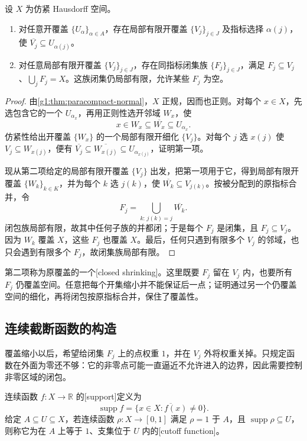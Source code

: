 \begin{lemma}\label{g1:lem:cover-shrinking}
	设 \(X\) 为仿紧 Hausdorff 空间。
	\begin{enumerate}
		\item 对任意开覆盖 \(\{U_\alpha\}_{\alpha\in A}\)，存在局部有限开覆盖 \(\{V_j\}_{j\in J}\) 及指标选择 \(\alpha(j)\)，使 \(\overline{V_j}\subseteq U_{\alpha(j)}\)。
		\item 对任意局部有限开覆盖 \(\{V_j\}_{j\in J}\)，存在同指标闭集族 \(\{F_j\}_{j\in J}\)，满足 \(F_j\subseteq V_j\)、\(\bigcup_jF_j=X\)。这族闭集仍局部有限，允许某些 \(F_j\) 为空。
	\end{enumerate}
\end{lemma}
\begin{proof}
	由\cref{g1:thm:paracompact-normal}，\(X\) 正规，因而也正则。对每个 \(x\in X\)，先选包含它的一个 \(U_{\alpha_x}\)，再用正则性选开邻域 \(W_x\)，使
	\[
		x\in W_x\subseteq\overline{W_x}\subseteq U_{\alpha_x}.
	\]
	仿紧性给出开覆盖 \(\{W_x\}\) 的一个局部有限开细化 \(\{V_j\}\)。对每个 \(j\) 选 \(x(j)\) 使 \(V_j\subseteq W_{x(j)}\)，便有 \(\overline{V_j}\subseteq\overline{W_{x(j)}}\subseteq U_{\alpha_{x(j)}}\)，证明第一项。

	现从第二项给定的局部有限开覆盖 \(\{V_j\}\) 出发，把第一项用于它，得到局部有限开覆盖 \(\{W_k\}_{k\in K}\)，并为每个 \(k\) 选 \(j(k)\)，使 \(\overline{W_k}\subseteq V_{j(k)}\)。按被分配到的原指标合并，令
	\[
		F_j=\bigcup_{k:\,j(k)=j}\overline{W_k}.
	\]
	闭包族局部有限，故其中任何子族的并都闭；于是每个 \(F_j\) 是闭集，且 \(F_j\subseteq V_j\)。因为 \(W_k\) 覆盖 \(X\)，这些 \(F_j\) 也覆盖 \(X\)。最后，任何只遇到有限多个 \(V_j\) 的邻域，也只会遇到有限多个 \(F_j\)，故闭集族局部有限。
\end{proof}

第二项称为原覆盖的一个[closed shrinking]。这里既要 \(F_j\) 留在 \(V_j\) 内，也要所有 \(F_j\) 仍覆盖空间。任意把每个开集缩小并不能保证后一点；证明通过另一个仍覆盖空间的细化，再将闭包按原指标合并，保住了覆盖性。

\subsection{连续截断函数的构造}
\label{g1:subsec:0404:02}

覆盖缩小以后，希望给闭集 \(F_j\) 上的点权重 \(1\)，并在 \(V_j\) 外将权重关掉。只规定函数在外面为零还不够：它的非零点可能一直逼近不允许进入的边界，因此需要控制非零区域的闭包。

\begin{definition}\label{g1:def:support-cutoff}
	连续函数 \(f:X\rightarrow\mathbb R\) 的[support]定义为
	\[
		\operatorname{supp}f=\overline{\{x\in X:f(x)\ne0\}}.
	\]
	给定 \(A\subseteq U\subseteq X\)，若连续函数 \(\rho:X\rightarrow[0,1]\) 满足 \(\rho=1\) 于 \(A\)，且 \(\operatorname{supp}\rho\subseteq U\)，则称它为在 \(A\) 上等于 \(1\)、支集位于 \(U\) 内的[cutoff function]。
\end{definition}

